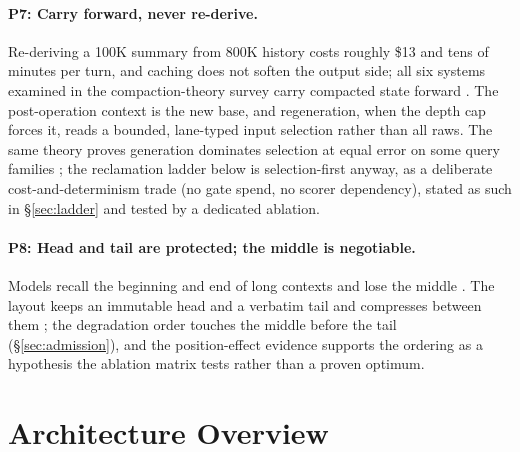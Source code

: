 \documentclass[11pt]{article}
\begin{document}
\paragraph{P7: Carry forward, never re-derive.} Re-deriving a 100K summary from 800K history costs roughly \$13 and tens of minutes per turn, and caching does not soften the output side; all six systems examined in the compaction-theory survey carry compacted state forward \cite{theory2026}. The post-operation context is the new base, and regeneration, when the depth cap forces it, reads a bounded, lane-typed input selection rather than all raws. The same theory proves generation dominates selection at equal error on some query families \cite{theory2026}; the reclamation ladder below is selection-first anyway, as a deliberate cost-and-determinism trade (no gate spend, no scorer dependency), stated as such in \S\ref{sec:ladder} and tested by a dedicated ablation.

\paragraph{P8: Head and tail are protected; the middle is negotiable.} Models recall the beginning and end of long contexts and lose the middle \cite{lost2024}. The layout keeps an immutable head and a verbatim tail and compresses between them \cite{cat2026}; the degradation order touches the middle before the tail (\S\ref{sec:admission}), and the position-effect evidence supports the ordering as a hypothesis the ablation matrix tests rather than a proven optimum.

\section{Architecture Overview}
\end{document}
